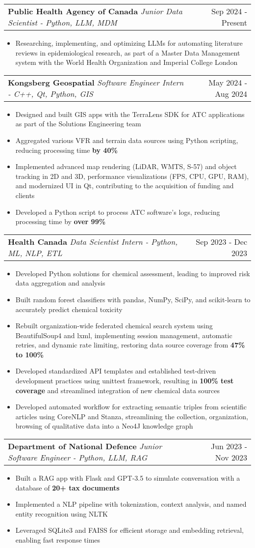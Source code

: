\documentclass[letterpaper,11pt]{article}
\makeatletter
\newcommand{\resumeItem}[1]{
  \item\small{
    {#1 \vspace{-2.75pt}}
  }
}
\newcommand{\resumeSubheading}[3]{
    \item
    \begin{tabular*}{0.97\textwidth}[t]{l@{\extracolsep{\fill}}r}
      \textbf{#1} \textbar \textit{ #2} & #3 \\
    \end{tabular*}\vspace{-8pt}
}
\newcommand{\resumeItemListStart}{\begin{itemize}}
\newcommand{\resumeItemListEnd}{\end{itemize}\vspace{-5pt}}
\makeatother
\begin{document}
    \resumeSubheading{Public Health Agency of Canada}{Junior Data Scientist - Python, LLM, MDM}{Sep 2024 - Present}
      \resumeItemListStart
        \resumeItem{Researching, implementing, and optimizing LLMs for automating literature reviews in epidemiological research, as part of a Master Data Management system with the World Health Organization and Imperial College London}
      \resumeItemListEnd

    \resumeSubheading{Kongsberg Geospatial}{Software Engineer Intern - C++, Qt, Python, GIS}{May 2024 - Aug 2024}
      \resumeItemListStart
        \resumeItem{Designed and built GIS apps with the TerraLens SDK for ATC applications as part of the Solutions Engineering team}
        \resumeItem{Aggregated various VFR and terrain data sources using Python scripting, reducing processing time \textbf{by 40\%}}
        \resumeItem{Implemented advanced map rendering (LiDAR, WMTS, S-57) and object tracking in 2D and 3D, performance visualizations (FPS, CPU, GPU, RAM), and modernized UI in Qt, contributing to the acquisition of funding and clients}
        \resumeItem{Developed a Python script to process ATC software's logs, reducing processing time by \textbf{over 99\%}}
      \resumeItemListEnd

    \resumeSubheading{Health Canada}{Data Scientist Intern - Python, ML, NLP, ETL}{Sep 2023 - Dec 2023}
      \resumeItemListStart
        \resumeItem{Developed Python solutions for chemical assessment, leading to improved risk data aggregation and analysis}
        \resumeItem{Built random forest classifiers with pandas, NumPy, SciPy, and scikit-learn to accurately predict chemical toxicity}
        \resumeItem{Rebuilt organization-wide federated chemical search system using BeautifulSoup4 and lxml, implementing session management, automatic retries, and dynamic rate limiting, restoring data source coverage from \textbf{47\% to 100\%}}
        \resumeItem{Developed standardized API templates and established test-driven development practices using unittest framework, resulting in \textbf{100\% test coverage} and streamlined integration of new chemical data sources}
        \resumeItem{Developed automated workflow for extracting semantic triples from scientific articles using CoreNLP and Stanza, streamlining the collection, organization, browsing of qualitative data into a Neo4J knowledge graph}
      \resumeItemListEnd

    \resumeSubheading{Department of National Defence}{Junior Software Engineer - Python, LLM, RAG}{Jun 2023 - Nov 2023}
      \resumeItemListStart
        \resumeItem{Built a RAG app with Flask and GPT-3.5 to simulate conversation with a database of \textbf{20+ tax documents}}
        \resumeItem{Implemented a NLP pipeline with tokenization, context analysis, and named entity recognition using NLTK}
        \resumeItem{Leveraged SQLite3 and FAISS for efficient storage and embedding retrieval, enabling fast response times}
      \resumeItemListEnd
\end{document}
